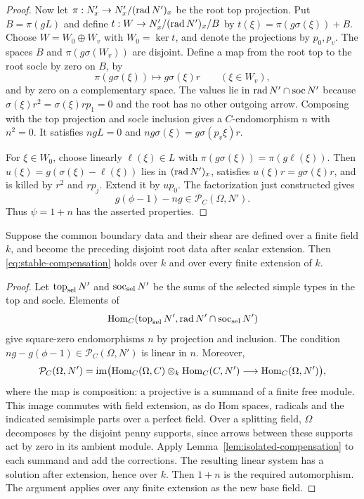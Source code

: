 \begin{proof}
Now let $\pi:N'_x\to N'_x/(\operatorname{rad} N')_x$ be the root top projection. Put $B=\pi(gL)$ and define $t:W\to N'_x/(\operatorname{rad} N')_x/B$ by $t(\xi)=\pi(g\sigma(\xi))+B$. Choose $W=W_0\oplus W_v$ with $W_0=\ker t$, and denote the projections by $p_0,p_v$. The spaces $B$ and $\pi(g\sigma(W_v))$ are disjoint. Define a map from the root top to the root socle by zero on $B$, by
\[
 \pi(g\sigma(\xi))\longmapsto g\sigma(\xi)r\qquad(\xi\in W_v),
\]
and by zero on a complementary space. The values lie in $\operatorname{rad} N'\cap\operatorname{soc} N'$ because $\sigma(\xi)r^2=\sigma(\xi)rp_1=0$ and the root has no other outgoing arrow. Composing with the top projection and socle inclusion gives a $C$-endomorphism $n$ with $n^2=0$. It satisfies $ngL=0$ and $ng\sigma(\xi)=g\sigma(p_v\xi)r$.

For $\xi\in W_0$, choose linearly $\ell(\xi)\in L$ with $\pi(g\sigma(\xi))=\pi(g\ell(\xi))$. Then $u(\xi)=g(\sigma(\xi)-\ell(\xi))$ lies in $(\operatorname{rad} N')_x$, satisfies $u(\xi)r=g\sigma(\xi)r$, and is killed by $r^2$ and $rp_j$. Extend it by $u p_0$. The factorization just constructed gives
\[
 g(\phi-1)-ng\in\mathcal P_C(\Omega,N').
\]
Thus $\psi=1+n$ has the asserted properties.
\end{proof}

\begin{lemma}\label{lem:compensation-descent}
Suppose the common boundary data and their shear are defined over a finite field $k$, and become the preceding disjoint root data after scalar extension. Then \eqref{eq:stable-compensation} holds over $k$ and over every finite extension of $k$.
\end{lemma}
\begin{proof}
Let $\operatorname{top}_{\rm sel}N'$ and $\operatorname{soc}_{\rm sel}N'$ be the sums of the selected simple types in the top and socle. Elements of
\[
 \operatorname{Hom}_C(\operatorname{top}_{\rm sel}N',\operatorname{rad} N'\cap\operatorname{soc}_{\rm sel}N')
\]
give square-zero endomorphisms $n$ by projection and inclusion. The condition $ng-g(\phi-1)\in\mathcal P_C(\Omega,N')$ is linear in $n$. Moreover,
\[
 \mathcal P_C(\Omega,N')=\operatorname{im}\bigl(
 \operatorname{Hom}_C(\Omega,C)\otimes_k\operatorname{Hom}_C(C,N')\longrightarrow\operatorname{Hom}_C(\Omega,N')\bigr),
\]
where the map is composition: a projective is a summand of a finite free module. This image commutes with field extension, as do Hom spaces, radicals and the indicated semisimple parts over a perfect field. Over a splitting field, $\Omega$ decomposes by the disjoint penny supports, since arrows between these supports act by zero in its ambient module. Apply Lemma~\ref{lem:isolated-compensation} to each summand and add the corrections. The resulting linear system has a solution after extension, hence over $k$. Then $1+n$ is the required automorphism. The argument applies over any finite extension as the new base field.
\end{proof}

